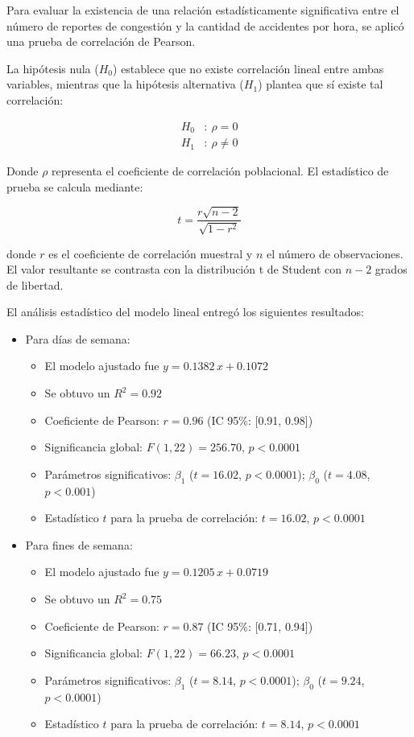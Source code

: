\documentclass[12pt]{article}
\begin{document}
Para evaluar la existencia de una relación estadísticamente significativa entre el número de reportes de congestión y la cantidad de accidentes por hora, se aplicó una prueba de correlación de Pearson.

La hipótesis nula ($H_0$) establece que no existe correlación lineal entre ambas variables, mientras que la hipótesis alternativa ($H_1$) plantea que sí existe tal correlación:

\begin{align}
H_0&:\ \rho = 0 \\
H_1&:\ \rho \ne 0
\end{align}

Donde $\rho$ representa el coeficiente de correlación poblacional. El estadístico de prueba se calcula mediante:

\begin{equation}
t = \frac{r \sqrt{n - 2}}{\sqrt{1 - r^2}}
\end{equation}

donde $r$ es el coeficiente de correlación muestral y $n$ el número de observaciones. El valor resultante se contrasta con la distribución t de Student con $n - 2$ grados de libertad.

El análisis estadístico del modelo lineal entregó los siguientes resultados:

\begin{itemize}
    \item Para días de semana:
    \begin{itemize}
        \item El modelo ajustado fue $y = 0.1382\,x + 0.1072$
        \item Se obtuvo un $R^2 = 0.92$
        \item Coeficiente de Pearson: $r = 0.96$ (IC 95\%: [0.91, 0.98])
        \item Significancia global: $F(1, 22) = 256.70$, $p < 0.0001$
        \item Parámetros significativos: $\beta_1$ ($t = 16.02$, $p < 0.0001$); $\beta_0$ ($t = 4.08$, $p < 0.001$)
        \item Estadístico $t$ para la prueba de correlación: $t = 16.02$, $p < 0.0001$
    \end{itemize}

    \item Para fines de semana:
    \begin{itemize}
        \item El modelo ajustado fue $y = 0.1205\,x + 0.0719$
        \item Se obtuvo un $R^2 = 0.75$
        \item Coeficiente de Pearson: $r = 0.87$ (IC 95\%: [0.71, 0.94])
        \item Significancia global: $F(1, 22) = 66.23$, $p < 0.0001$
        \item Parámetros significativos: $\beta_1$ ($t = 8.14$, $p < 0.0001$); $\beta_0$ ($t = 9.24$, $p < 0.0001$)
        \item Estadístico $t$ para la prueba de correlación: $t = 8.14$, $p < 0.0001$
    \end{itemize}
\end{itemize}
\end{document}
